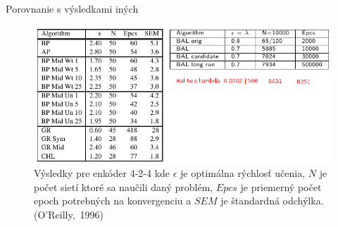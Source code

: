 \documentclass[xcolor=dvipsnames]{beamer}
\begin{document}
\begin{frame}{Porovnanie s výsledkami iných}

  \begin{figure}[h!]  
    \centering
    \includegraphics[scale=0.45]{img/comparison_both.png} 
    \caption{Výsledky pre enkóder 4-2-4 kde $\epsilon$ je optimálna rýchlosť učenia, $N$ je počet sietí ktoré sa naučili daný problém, $Epcs$ je priemerný počet epoch potrebných na konvergenciu a $SEM$ je štandardná odchýlka. (O'Reilly,~1996)} 
  \end{figure} 
  \begin{center}
    
  \end{center} 
\end{frame}
\end{document}
